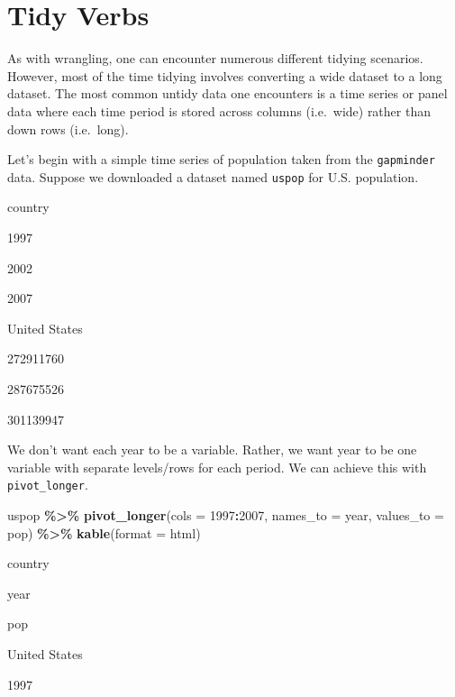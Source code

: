 \documentclass[
]{book}
\makeatletter
\newenvironment{Shaded}{\begin{snugshade}}{\end{snugshade}}
\newcommand{\AttributeTok}[1]{\textcolor[rgb]{0.27,0.27,0.27}{#1}}
\newcommand{\FunctionTok}[1]{\textcolor[rgb]{0.27,0.27,0.27}{\textbf{#1}}}
\newcommand{\NormalTok}[1]{#1}
\newcommand{\SpecialCharTok}[1]{\textcolor[rgb]{0.43,0.43,0.43}{\textbf{#1}}}
\newcommand{\StringTok}[1]{\textcolor[rgb]{0.5,0.5,0.5}{#1}}
\newenvironment{kframe}{%
\medskip{}
\setlength{\fboxsep}{.8em}
 \def\at@end@of@kframe{}%
 \ifinner\ifhmode%
  \def\at@end@of@kframe{\end{minipage}}%
  \begin{minipage}{\columnwidth}%
 \fi\fi%
 \def\FrameCommand##1{\hskip\@totalleftmargin \hskip-\fboxsep
 \colorbox{shadecolor}{##1}\hskip-\fboxsep
     \hskip-\linewidth \hskip-\@totalleftmargin \hskip\columnwidth}%
 \MakeFramed {\advance\hsize-\width
   \@totalleftmargin\z@ \linewidth\hsize
   \@setminipage}}%
 {\par\unskip\endMakeFramed%
 \at@end@of@kframe}
\renewenvironment{Shaded}{\begin{kframe}}{\end{kframe}}
\makeatother
\begin{document}
\hypertarget{tidy-verbs}{%
\section{Tidy Verbs}\label{tidy-verbs}}

As with wrangling, one can encounter numerous different tidying scenarios. However, most of the time tidying involves converting a wide dataset to a long dataset. The most common untidy data one encounters is a time series or panel data where each time period is stored across columns (i.e.~wide) rather than down rows (i.e.~long).

Let's begin with a simple time series of population taken from the \texttt{gapminder} data. Suppose we downloaded a dataset named \texttt{uspop} for U.S. population.

country

1997

2002

2007

United States

272911760

287675526

301139947

We don't want each year to be a variable. Rather, we want year to be one variable with separate levels/rows for each period. We can achieve this with \texttt{pivot\_longer}.

\begin{Shaded}
\begin{Highlighting}[]
\NormalTok{uspop }\SpecialCharTok{\%\textgreater{}\%} 
  \FunctionTok{pivot\_longer}\NormalTok{(}\AttributeTok{cols =} \StringTok{\textquotesingle{}1997\textquotesingle{}}\SpecialCharTok{:}\StringTok{\textquotesingle{}2007\textquotesingle{}}\NormalTok{, }
               \AttributeTok{names\_to =} \StringTok{\textquotesingle{}year\textquotesingle{}}\NormalTok{,}
               \AttributeTok{values\_to =} \StringTok{\textquotesingle{}pop\textquotesingle{}}\NormalTok{) }\SpecialCharTok{\%\textgreater{}\%} 
  \FunctionTok{kable}\NormalTok{(}\AttributeTok{format =} \StringTok{\textquotesingle{}html\textquotesingle{}}\NormalTok{)}
\end{Highlighting}
\end{Shaded}

country

year

pop

United States

1997
\end{document}
